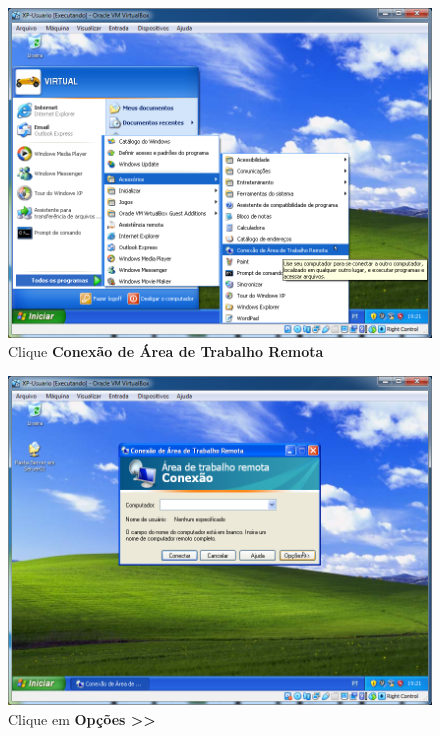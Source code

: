 \documentclass[10pt]{article}
\begin{document}
\begin{figure}[H]
    \centering
    \caption{Clique \textbf{Conexão de Área de Trabalho Remota}}
    \label{fig:ar021}
    \includegraphics[width=\linewidth]{images/acesso_remoto/ar021.png}
\end{figure}
\begin{figure}[H]
    \centering
    \caption{Clique em \textbf{Opções >>}}
    \label{fig:ar022}
    \includegraphics[width=\linewidth]{images/acesso_remoto/ar022.png}
\end{figure}
\end{document}
